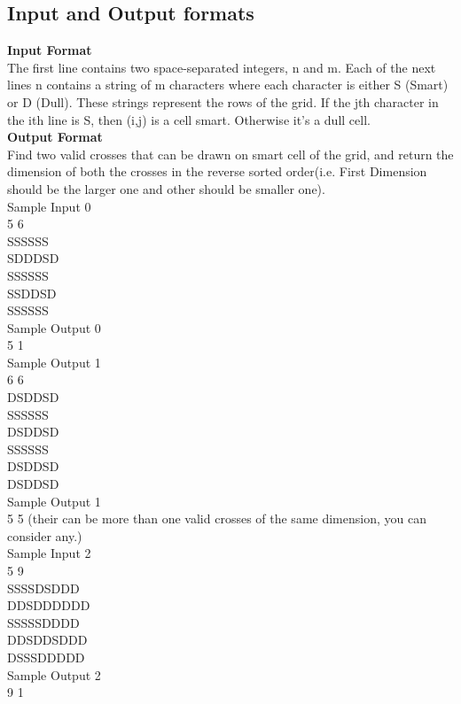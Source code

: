\documentclass[a4paper,12pt]{article}
\begin{document}
\begin{flushleft}
\subsection{Input and Output formats}
\textbf{Input Format} \\
The first line contains two space-separated integers,  n and m. 
Each of the next  lines n contains a string of  m characters where each character is either S (Smart) or D (Dull). These strings represent the rows of the grid. If the jth character in the ith  line is S, then  (i,j) is a  cell smart. Otherwise it's a  dull cell.\\

\textbf{Output Format} \\
Find two valid crosses that can be drawn on smart cell of the grid, and return the dimension of both the crosses in the reverse sorted order(i.e. First Dimension should be the larger one and other should be smaller one).\\
Sample Input 0\\
5 6\\
SSSSSS\\
SDDDSD\\
SSSSSS\\
SSDDSD\\
SSSSSS\\

Sample Output 0\\
5 1\\

Sample Output 1\\
6 6\\
DSDDSD\\
SSSSSS\\
DSDDSD\\
SSSSSS\\
DSDDSD\\
DSDDSD\\

Sample Output 1\\
5 5 (their can be more than one valid crosses of the same dimension, you can consider any.)\\
Sample Input 2\\
5 9\\
SSSSDSDDD\\ 
DDSDDDDDD\\
SSSSSDDDD\\
DDSDDSDDD\\
DSSSDDDDD\\

Sample Output 2\\
9 1\\






\end{flushleft}
\end{document}
